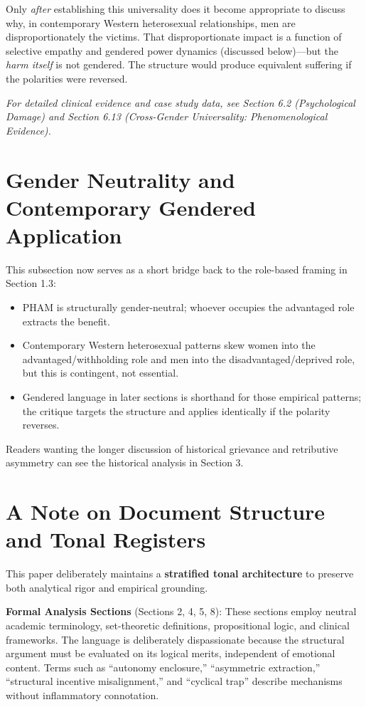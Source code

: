 \documentclass[12pt,openany]{book}
\numberwithin{equation}{chapter}
\begin{document}
Only \textit{after} establishing this universality does it become appropriate to discuss why, in contemporary Western heterosexual relationships, men are disproportionately the victims. That disproportionate impact is a function of selective empathy and gendered power dynamics (discussed below)---but the \textit{harm itself} is not gendered. The structure would produce equivalent suffering if the polarities were reversed.

\textit{For detailed clinical evidence and case study data, see Section 6.2 (Psychological Damage) and Section 6.13 (Cross-Gender Universality: Phenomenological Evidence).}

\section{Gender Neutrality and Contemporary Gendered Application}
This subsection now serves as a short bridge back to the role-based framing in Section 1.3:
\begin{itemize}
    \item PHAM is structurally gender-neutral; whoever occupies the advantaged role extracts the benefit.
    \item Contemporary Western heterosexual patterns skew women into the advantaged/withholding role and men into the disadvantaged/deprived role, but this is contingent, not essential.
    \item Gendered language in later sections is shorthand for those empirical patterns; the critique targets the structure and applies identically if the polarity reverses.
\end{itemize}
Readers wanting the longer discussion of historical grievance and retributive asymmetry can see the historical analysis in Section 3.

\section{A Note on Document Structure and Tonal Registers}

This paper deliberately maintains a \textbf{stratified tonal architecture} to preserve both analytical rigor and empirical grounding.

\textbf{Formal Analysis Sections} (Sections 2, 4, 5, 8): These sections employ neutral academic terminology, set-theoretic definitions, propositional logic, and clinical frameworks. The language is deliberately dispassionate because the structural argument must be evaluated on its logical merits, independent of emotional content. Terms such as ``autonomy enclosure,'' ``asymmetric extraction,'' ``structural incentive misalignment,'' and ``cyclical trap'' describe mechanisms without inflammatory connotation.
\end{document}
